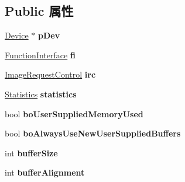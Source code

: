 \subsection*{Public 属性}
\begin{DoxyCompactItemize}
\item 
\hypertarget{struct_capture_parameter_aa7279be7a837828ce47beb77b183c51e}{\hyperlink{classmv_i_m_p_a_c_t_1_1acquire_1_1_device}{Device} $\ast$ {\bfseries p\+Dev}}\label{struct_capture_parameter_aa7279be7a837828ce47beb77b183c51e}

\item 
\hypertarget{struct_capture_parameter_a7c4a618ce4d1c558927d60db3a7c9211}{\hyperlink{classmv_i_m_p_a_c_t_1_1acquire_1_1_function_interface}{Function\+Interface} {\bfseries fi}}\label{struct_capture_parameter_a7c4a618ce4d1c558927d60db3a7c9211}

\item 
\hypertarget{struct_capture_parameter_ace1cc142eb25fe7226d97435c9e8ae42}{\hyperlink{classmv_i_m_p_a_c_t_1_1acquire_1_1_image_request_control}{Image\+Request\+Control} {\bfseries irc}}\label{struct_capture_parameter_ace1cc142eb25fe7226d97435c9e8ae42}

\item 
\hypertarget{struct_capture_parameter_a0045a025e9ec177b7012a3b848bc997a}{\hyperlink{classmv_i_m_p_a_c_t_1_1acquire_1_1_statistics}{Statistics} {\bfseries statistics}}\label{struct_capture_parameter_a0045a025e9ec177b7012a3b848bc997a}

\item 
\hypertarget{struct_capture_parameter_aa25c568114503d76bc21c1347891da9b}{bool {\bfseries bo\+User\+Supplied\+Memory\+Used}}\label{struct_capture_parameter_aa25c568114503d76bc21c1347891da9b}

\item 
\hypertarget{struct_capture_parameter_a7193addc288937899352a0009d55afe5}{bool {\bfseries bo\+Always\+Use\+New\+User\+Supplied\+Buffers}}\label{struct_capture_parameter_a7193addc288937899352a0009d55afe5}

\item 
\hypertarget{struct_capture_parameter_a0c900e46f00dea57f1fbbc0edf117709}{int {\bfseries buffer\+Size}}\label{struct_capture_parameter_a0c900e46f00dea57f1fbbc0edf117709}

\item 
\hypertarget{struct_capture_parameter_aa52e3f992514f2c9659ad88eeaf8afab}{int {\bfseries buffer\+Alignment}}\label{struct_capture_parameter_aa52e3f992514f2c9659ad88eeaf8afab}


\end{DoxyCompactItemize}
